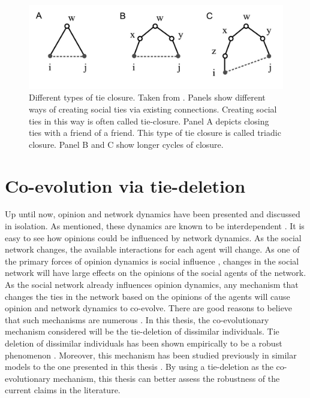 \documentclass[11pt]{article}
\begin{document}
\begin{figure}[H]
    \centering
    \includegraphics[width=.8\linewidth]{../plots/references/kossinets_watts.jpeg}
  \caption{Different types of tie closure. Taken from \protect{}. Panels show different ways of creating social ties via existing connections. Creating social ties in this way is often called tie-closure. Panel A depicts closing ties with a friend of a friend. This type of tie closure is called triadic closure. Panel B and C show longer cycles of closure.}
  \label{fig:tie_closure}
\end{figure}

\section{Co-evolution via tie-deletion}
Up until now, opinion and network dynamics have been presented and discussed in isolation. As mentioned, these dynamics are known to be interdependent \cite{bener_empirical_2016, kossinets_origins_2009, galesic_integrating_2021}.
It is easy to see how opinions could be influenced by network dynamics. 
As the social network changes, the available interactions for each agent will change. 
As one of the primary forces of opinion dynamics is social influence \cite{levin_dynamics_2021, chacoma_opinion_2015}, changes in the social network will have large effects on the opinions of the social agents of the network. 
As the social network already influences opinion dynamics, any mechanism that changes the ties in the network based on the opinions of the agents will cause opinion and network dynamics to co-evolve. 
There are good reasons to believe that such mechanisms are numerous \cite{bener_empirical_2016, kossinets_origins_2009, levin_dynamics_2021}.
In this thesis, the co-evolutionary mechanism considered will be the tie-deletion of dissimilar individuals. 
Tie deletion of dissimilar individuals has been shown empirically to be a robust phenomenon \cite{kossinets_origins_2009, bener_empirical_2016}. Moreover, this mechanism has been studied previously in similar models to the one presented in this thesis \cite{santos_cooperation_2006,sasahara_social_2021}. 
By using a tie-deletion as the co-evolutionary mechanism, this thesis can better assess the robustness of the current claims in the literature. 
\end{document}
